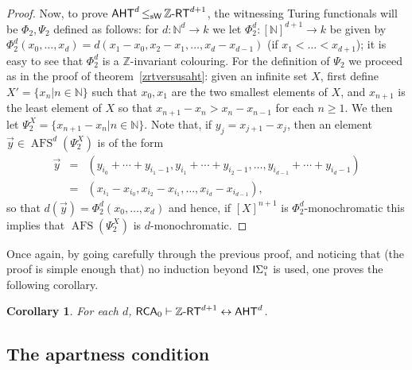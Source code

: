 \documentclass[10pt,a4paper]{amsart}
\newcommand{\zrt}{\mathnormal{\mathbb Z\text{-}\mathsf{RT}}}
\newcommand{\aht}{\mathnormal{\mathsf{AHT}}}
\newcommand{\rca}{\mathnormal{\mathsf{RCA}}_0}
\newcommand{\weisleq}{\mathop{\leq_{\mathrm{s}\mathsf{W}}}}
\newcommand{\isigma}{\mathnormal{\mathsf{I}\mathrm{\Sigma}_1^0}}
\DeclareMathOperator{\afs}{AFS}
\newtheorem{corollary}[theorem]{Corollary}
\theoremstyle{definition}
\begin{document}
\begin{proof}
Now, to prove $\aht^d\weisleq\zrt^{d+1}$, the witnessing Turing functionals will be $\Phi_2,\Psi_2$ defined as follows: for $d:\mathbb N^d\longrightarrow k$ we let $\Phi_2^d:[\mathbb N]^{d+1}\longrightarrow k$ be given by $\Phi_2^d(x_0,\ldots,x_d)=d(x_1-x_0,x_2-x_1,\ldots,x_d-x_{d-1})$ (if $x_1<\ldots<x_{d+1}$); it is easy to see that $\Phi_2^d$ is a $\mathbb Z$-invariant colouring. For the definition of $\Psi_2$ we proceed as in the proof of theorem~\ref{zrtversusaht}: given an infinite set $X$, first define $X'=\{x_n\big|n\in\mathbb N\}$ such that $x_0,x_1$ are the two smallest elements of $X$, and $x_{n+1}$ is the least element of $X$ so that $x_{n+1}-x_n>x_n-x_{n-1}$ for each $n\geq 1$. We then let $\Psi_2^X=\{x_{n+1}-x_n\big|n\in\mathbb N\}$. Note that, if $y_j=x_{j+1}-x_j$, then an element $\vec{y}\in\afs^d(\Psi_2^X)$ is of the form
\begin{eqnarray*}
\vec{y} & = & (y_{i_0}+\cdots+y_{i_{1}-1},y_{i_1}+\cdots+y_{i_2-1},\ldots,y_{i_{d-1}}+\cdots+y_{i_d-1}) \\
& = & (x_{i_1}-x_{i_0},x_{i_2}-x_{i_1},\ldots,x_{i_d}-x_{i_{d-1}}), 
\end{eqnarray*}
so that $d(\vec{y})=\Phi_2^d(x_0,\ldots,x_d)$ and hence, if $[X]^{n+1}$ is $\Phi_2^d$-monochromatic this implies that $\afs(\Psi_2^X)$ is $d$-monochromatic.
\end{proof}

Once again, by going carefully through the previous proof, and noticing that (the proof is simple enough that) no induction beyond $\isigma$ is used, one proves the following corollary.

\begin{corollary}
For each $d$, $\rca\vdash\zrt^{d+1}\leftrightarrow\aht^d$.
\end{corollary}

\subsection{The apartness condition}
\end{document}
